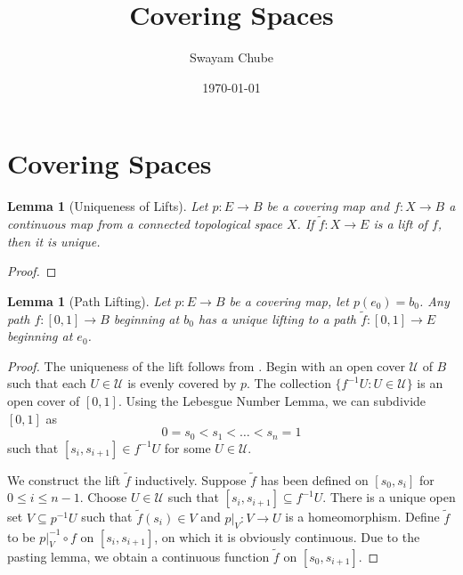 \documentclass[10pt]{article}
\title{Covering Spaces}
\author{Swayam Chube}
\date{\today}
\theoremstyle{thmstyle}
\newtheorem{lemma}[theorem]{Lemma}
\theoremstyle{defstyle}
\newcommand{\wt}[1]{\widetilde{#1}}
\renewcommand{\le}{\leqslant}
\begin{document}
\maketitle

\section{Covering Spaces}

\begin{lemma}[Uniqueness of Lifts]
    Let $p: E\to B$ be a covering map and $f: X\to B$ a continuous map from a connected topological space $X$. If $\wt f: X\to E$ is a lift of $f$, then it is unique.
\end{lemma}
\begin{proof}
    
\end{proof}

\begin{lemma}[Path Lifting]
    Let $p: E\to B$ be a covering map, let $p(e_0) = b_0$. Any path $f: [0, 1]\to B$ beginning at $b_0$ has a unique lifting to a path $\wt f: [0,1]\to E$ beginning at $e_0$.
\end{lemma}
\begin{proof}
    The uniqueness of the lift follows from . Begin with an open cover $\mathscr U$ of $B$ such that each $U\in\mathscr U$ is evenly covered by $p$. The collection $\{f^{-1}U\colon U\in\mathscr U\}$ is an open cover of $[0, 1]$. Using the Lebesgue Number Lemma, we can subdivide $[0, 1]$ as
    \begin{equation*}
        0 = s_0 < s_1 < \dots < s_n = 1
    \end{equation*}
    such that $[s_i, s_{i + 1}]\in f^{-1}U$ for some $U\in\mathscr U$. 
    
    We construct the lift $\wt f$ inductively. Suppose $\wt f$ has been defined on $[s_0, s_i]$ for $0\le i\le n - 1$. Choose $U\in\mathscr U$ such that $[s_i, s_{i + 1}]\subseteq f^{-1}U$. There is a unique open set $V\subseteq p^{-1}U$ such that $\wt f(s_i)\in V$ and $p|_V: V\to U$ is a homeomorphism. Define $\wt f$ to be $p|_V^{-1}\circ f$ on $[s_i, s_{i + 1}]$, on which it is obviously continuous. Due to the pasting lemma, we obtain a continuous function $\wt f$ on $[s_0, s_{i + 1}]$.
\end{proof}
\end{document}
